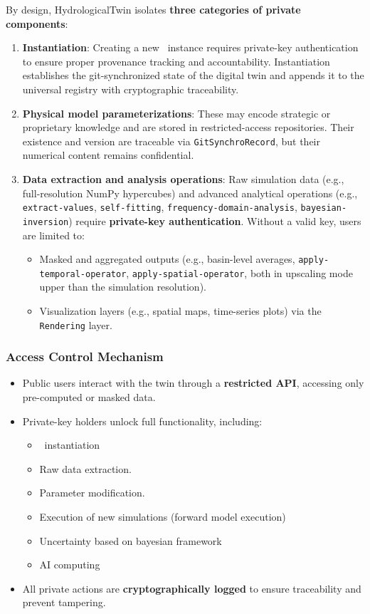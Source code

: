 By design, HydrologicalTwin isolates \textbf{three categories of private components}:
\begin{enumerate}
    \item \textbf{Instantiation}: Creating a new \hydrot\ instance requires private-key authentication to ensure proper provenance tracking and accountability. Instantiation establishes the git-synchronized state of the digital twin and appends it to the universal registry with cryptographic traceability.
    \item \textbf{Physical model parameterizations}: These may encode strategic or proprietary knowledge and are stored in restricted-access repositories. Their existence and version are traceable via \texttt{GitSynchroRecord}, but their numerical content remains confidential.
    \item \textbf{Data extraction and analysis operations}: Raw simulation data (e.g., full-resolution NumPy hypercubes) and advanced analytical operations (e.g., \texttt{extract-values}, \texttt{self-fitting}, \texttt{frequency-domain-analysis}, \texttt{bayesian-inversion}) require \textbf{private-key authentication}. Without a valid key, users are limited to:
    \begin{itemize}
        \item Masked and aggregated outputs (e.g., basin-level averages, \texttt{apply-temporal-operator}, \texttt{apply-spatial-operator}, both in upscaling mode upper than the simulation resolution).
        \item Visualization layers (e.g., spatial maps, time-series plots) via the \texttt{Rendering} layer.
    \end{itemize}
\end{enumerate}

\subsubsection*{Access Control Mechanism}
\begin{itemize}
    \item Public users interact with the twin through a \textbf{restricted API}, accessing only pre-computed or masked data.
    \item Private-key holders unlock full functionality, including:
    \begin{itemize}
        \item \hydrot\ instantiation
        \item Raw data extraction.
        \item Parameter modification.
        \item Execution of new simulations (forward model execution)
        \item Uncertainty based on bayesian framework
        \item AI computing
    \end{itemize}
    \item All private actions are \textbf{cryptographically logged} to ensure traceability and prevent tampering.
\end{itemize}

